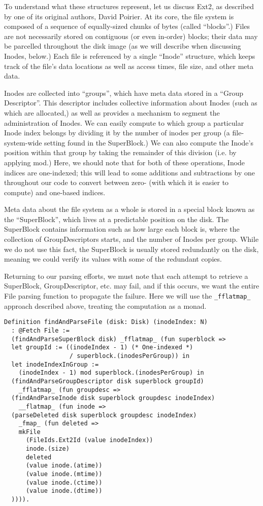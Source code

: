 \documentclass[nocopyrightspace,preprint]{sigplanconf}
\begin{document}
To understand what these structures represent, let us discuss Ext2, as
described by one of its original authors, David Poirier\cite{non-gnu}. At its
core, the file system is composed of a sequence of equally-sized chunks of
bytes (called ``blocks''.) Files are not necessarily stored on contiguous (or
even in-order) blocks; their data may be parcelled throughout the disk image
(as we will describe when discussing Inodes, below.) Each file is referenced
by a single ``Inode'' structure, which keeps track of the file's data
locations as well as access times, file size, and other meta data. 

Inodes are collected into ``groups'', which have meta data stored in a ``Group
Descriptor''. This descriptor includes collective information about Inodes
(such as which are allocated,) as well as provides a mechanism to segment the
administration of Inodes. We can easily compute to which group a particular
Inode index belongs by dividing it by the number of inodes per group (a
file-system-wide setting found in the SuperBlock.) We can also compute the
Inode's position within that group by taking the remainder of this division
(i.e. by applying mod.) Here, we should note that for both of these
operations, Inode indices are one-indexed; this will lead to some additions
and subtractions by one throughout our code to convert between zero- (with
which it is easier to compute) and one-based indices.

Meta data about the file system as a whole is stored in a special block known
as the ``SuperBlock'', which lives at a predictable position on the disk. The
SuperBlock contains information such as how large each block is, where the
collection of GroupDescriptors starts, and the number of Inodes per group.
While we do not use this fact, the SuperBlock is usually stored redundantly on
the disk, meaning we could verify its values with some of the redundant
copies.

Returning to our parsing efforts, we must note that each attempt to retrieve a
SuperBlock, GroupDescriptor, etc. may fail, and if this occurs, we want the
entire File parsing function to propagate the failure. Here we will use the
{\tt \_fflatmap\_} approach described above, treating the computation as a
monad.

\begin{lstlisting}
Definition findAndParseFile (disk: Disk) (inodeIndex: N) 
  : @Fetch File :=
  (findAndParseSuperBlock disk) _fflatmap_ (fun superblock =>
  let groupId := ((inodeIndex - 1) (* One-indexed *)
                  / superblock.(inodesPerGroup)) in
  let inodeIndexInGroup := 
    (inodeIndex - 1) mod superblock.(inodesPerGroup) in
  (findAndParseGroupDescriptor disk superblock groupId) 
    _fflatmap_ (fun groupdesc =>
  (findAndParseInode disk superblock groupdesc inodeIndex) 
    __flatmap_ (fun inode =>
  (parseDeleted disk superblock groupdesc inodeIndex) 
    _fmap_ (fun deleted =>
    mkFile
      (FileIds.Ext2Id (value inodeIndex))
      inode.(size)
      deleted
      (value inode.(atime))
      (value inode.(mtime))
      (value inode.(ctime))
      (value inode.(dtime))
  )))).
\end{lstlisting}
\end{document}
